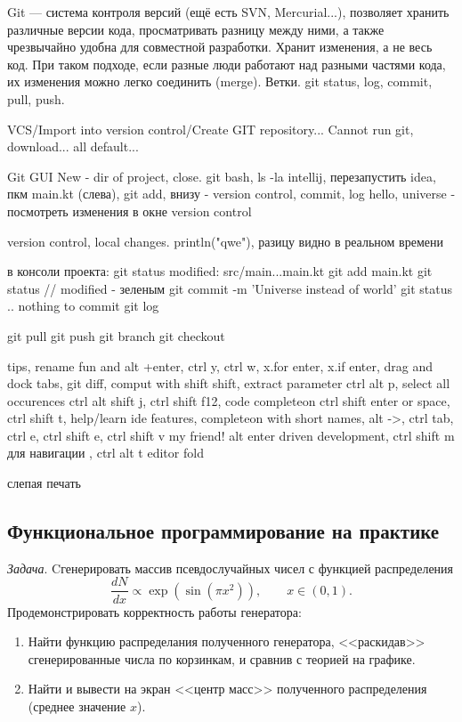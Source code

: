 \documentclass{book}
\begin{document}
Git --- система контроля версий (ещё есть SVN, Mercurial...), позволяет хранить различные версии
кода, просматривать разницу между ними, а также чрезвычайно удобна для совместной разработки.
Хранит изменения, а не весь код. При таком подходе, если разные люди работают над разными частями
кода, их изменения можно легко соединить (merge). Ветки. git status, log, commit, pull, push.

VCS/Import into version control/Create GIT repository...
Cannot run git, download...
all default...

Git GUI
New - dir of project, close. git bash, ls -la
intellij, перезапустить idea, пкм main.kt (слева), git add, внизу - version control, commit, log
hello, universe - посмотреть изменения в окне version control

version control, local changes.
println("qwe"), разицу видно в реальном времени

в консоли проекта:
git status
modified: src/main...main.kt
git add main.kt
git status // modified - зеленым
git commit -m 'Universe instead of world'
git status .. nothing to commit
git log

git pull
git push
git branch
git checkout

tips, rename fun and alt +enter, ctrl y, ctrl w, x.for enter, x.if enter, drag and dock tabs, git
diff, comput with shift shift, extract parameter ctrl alt p, select all occurences ctrl alt shift
j, ctrl shift f12, code completeon ctrl shift enter or space, ctrl shift t, help/learn ide
features, completeon with short names, alt ->, ctrl tab, ctrl e, ctrl shift e, ctrl shift v my
friend! alt enter driven development, ctrl shift m для навигации {}, ctrl alt t editor fold

слепая печать

\subsection{Функциональное программирование на практике}

\clearpage

\textit{Задача}. Cгенерировать массив псевдослучайных чисел с функцией распределения
\begin{equation}
    \frac{dN}{dx} \propto \exp(\sin(\pi x^2)), \qquad x \in (0, 1).
\end{equation}
Продемонстрировать корректность работы генератора:
\begin{enumerate}
  \item Найти функцию распределания полученного генератора, <<раскидав>> сгенерированные числа по
      корзинкам, и сравнив с теорией на графике.
  \item Найти и вывести на экран <<центр масс>> полученного распределения (среднее значение $x$).
\end{enumerate}
\end{document}
